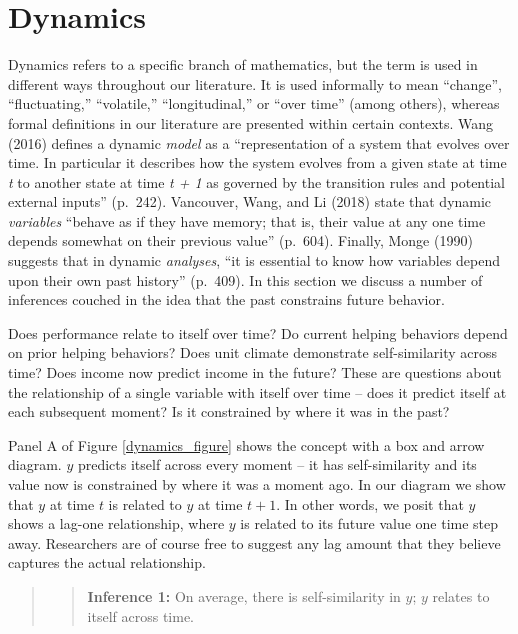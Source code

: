 \documentclass[english,,man]{apa6}
\theoremstyle{definition}
\theoremstyle{definition}
\theoremstyle{definition}
\theoremstyle{remark}
\begin{document}
\hypertarget{dynamics}{%
\section{Dynamics}\label{dynamics}}

Dynamics refers to a specific branch of mathematics, but the term is
used in different ways throughout our literature. It is used informally
to mean \enquote{change}, \enquote{fluctuating,} \enquote{volatile,}
\enquote{longitudinal,} or \enquote{over time} (among others), whereas
formal definitions in our literature are presented within certain
contexts. Wang (2016) defines a dynamic \emph{model} as a
\enquote{representation of a system that evolves over time. In
particular it describes how the system evolves from a given state at
time \emph{t} to another state at time \emph{t + 1} as governed by the
transition rules and potential external inputs} (p.~242). Vancouver,
Wang, and Li (2018) state that dynamic \emph{variables} \enquote{behave
as if they have memory; that is, their value at any one time depends
somewhat on their previous value} (p.~604). Finally, Monge (1990)
suggests that in dynamic \emph{analyses}, \enquote{it is essential to
know how variables depend upon their own past history} (p.~409). In this
section we discuss a number of inferences couched in the idea that the
past constrains future behavior.

Does performance relate to itself over time? Do current helping
behaviors depend on prior helping behaviors? Does unit climate
demonstrate self-similarity across time? Does income now predict income
in the future? These are questions about the relationship of a single
variable with itself over time -- does it predict itself at each
subsequent moment? Is it constrained by where it was in the past?

Panel A of Figure \ref{dynamics_figure} shows the concept with a box and
arrow diagram. \(y\) predicts itself across every moment -- it has
self-similarity and its value now is constrained by where it was a
moment ago. In our diagram we show that \(y\) at time \(t\) is related
to \(y\) at time \(t + 1\). In other words, we posit that \(y\) shows a
lag-one relationship, where \(y\) is related to its future value one
time step away. Researchers are of course free to suggest any lag amount
that they believe captures the actual relationship.

\begin{quote}
\begin{quote}
\textbf{Inference 1:} On average, there is self-similarity in \(y\);
\(y\) relates to itself across time.
\end{quote}
\end{quote}
\end{document}
